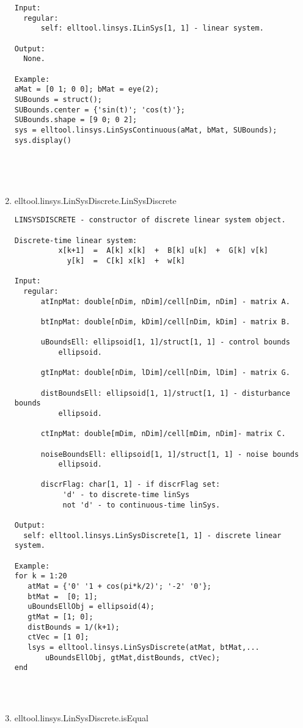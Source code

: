\begin{enumerate}
\begin{lstlisting}
Input:
  regular:
      self: elltool.linsys.ILinSys[1, 1] - linear system.

Output:
  None.

Example:
aMat = [0 1; 0 0]; bMat = eye(2);
SUBounds = struct();
SUBounds.center = {'sin(t)'; 'cos(t)'};
SUBounds.shape = [9 0; 0 2];
sys = elltool.linsys.LinSysContinuous(aMat, bMat, SUBounds);
sys.display()





\end{lstlisting}
\fontfamily{\familydefault}
\selectfont
\item {elltool.linsys.LinSysDiscrete.LinSysDiscrete}
\selectfont
\begin{lstlisting}
LINSYSDISCRETE - constructor of discrete linear system object.

Discrete-time linear system:
          x[k+1]  =  A[k] x[k]  +  B[k] u[k]  +  G[k] v[k]
            y[k]  =  C[k] x[k]  +  w[k]

Input:
  regular:
      atInpMat: double[nDim, nDim]/cell[nDim, nDim] - matrix A.

      btInpMat: double[nDim, kDim]/cell[nDim, kDim] - matrix B.

      uBoundsEll: ellipsoid[1, 1]/struct[1, 1] - control bounds
          ellipsoid.

      gtInpMat: double[nDim, lDim]/cell[nDim, lDim] - matrix G.

      distBoundsEll: ellipsoid[1, 1]/struct[1, 1] - disturbance bounds
          ellipsoid.

      ctInpMat: double[mDim, nDim]/cell[mDim, nDim]- matrix C.

      noiseBoundsEll: ellipsoid[1, 1]/struct[1, 1] - noise bounds
          ellipsoid.

      discrFlag: char[1, 1] - if discrFlag set:
           'd' - to discrete-time linSys
           not 'd' - to continuous-time linSys.

Output:
  self: elltool.linsys.LinSysDiscrete[1, 1] - discrete linear system.

Example:
for k = 1:20
   atMat = {'0' '1 + cos(pi*k/2)'; '-2' '0'};
   btMat =  [0; 1];
   uBoundsEllObj = ellipsoid(4);
   gtMat = [1; 0];
   distBounds = 1/(k+1);
   ctVec = [1 0];
   lsys = elltool.linsys.LinSysDiscrete(atMat, btMat,...
       uBoundsEllObj, gtMat,distBounds, ctVec);
end




\end{lstlisting}
\fontfamily{\familydefault}
\selectfont
\item {elltool.linsys.LinSysDiscrete.isEqual}
\selectfont
\begin{lstlisting}


\end{lstlisting}
\end{enumerate}
